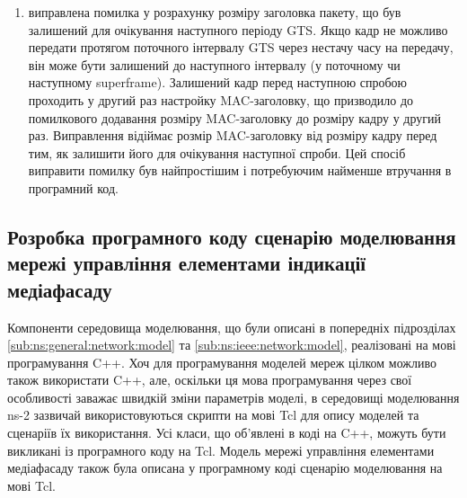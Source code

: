 \documentclass[a4paper,ukrainian,utf8,nocolumnsxix,nocolumnxxxii,nocolumnxxxi,floatsection,equationsection]{eskdtext}
\begin{document}
\begin{enumerate}
\begin{enumerate}
		\item виправлена помилка у розрахунку розміру заголовка пакету, що був залишений для очікування наступного періоду GTS. Якщо кадр не можливо передати протягом поточного інтервалу GTS через нестачу часу на передачу, він може бути залишений до наступного інтервалу (у поточному чи наступному superframe). Залишений кадр перед наступною спробою проходить у другий раз настройку MAC-заголовку, що призводило до помилкового додавання розміру MAC-заголовку до розміру кадру у другий раз. Виправлення відіймає розмір MAC-заголовку від розміру кадру перед тим, як залишити його для очікування наступної спроби. Цей спосіб виправити помилку був найпростішим і потребуючим найменше втручання в програмний код.
	\end{enumerate}

\end{enumerate}

\subsection{Розробка програмного коду сценарію моделювання мережі управління елементами індикації медіафасаду}

Компоненти середовища моделювання, що були описані в попередніх підрозділах \ref{sub:ns:general:network:model} та \ref{sub:ns:ieee:network:model}, реалізовані на мові програмування C++. Хоч для програмування моделей мереж цілком можливо також використати C++, але, оскільки ця мова програмування через свої особливості заважає швидкій зміни параметрів моделі, в середовищі моделювання ns-2 зазвичай використовуються скрипти на мові Tcl для опису моделей та сценаріїв їх використання. Усі класи, що об'явлені в коді на C++, можуть бути викликані із програмного коду на Tcl. Модель мережі управління елементами медіафасаду також була описана у програмному коді сценарію моделювання на мові Tcl.
\end{document}
